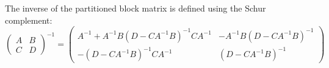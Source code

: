 \documentclass{article}
\begin{document}
The inverse of the partitioned block matrix is defined using the Schur complement:
\[
\begin{pmatrix}
A & B \\
C & D
\end{pmatrix}^{-1}
=
\begin{pmatrix}
A^{-1} + A^{-1}B(D - CA^{-1}B)^{-1}CA^{-1} & -A^{-1}B(D - CA^{-1}B)^{-1} \\
-(D - CA^{-1}B)^{-1}CA^{-1} & (D - CA^{-1}B)^{-1}
\end{pmatrix}
\]
\end{document}
